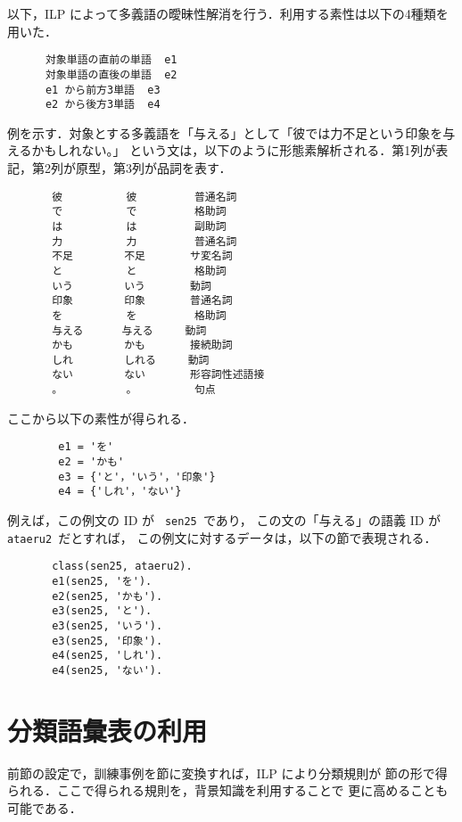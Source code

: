以下，ILP によって多義語の曖昧性解消を行う．利用する素性は以下の4種類を用いた．

\begin{verbatim}
      対象単語の直前の単語  e1 
      対象単語の直後の単語  e2 
      e1 から前方3単語  e3 
      e2 から後方3単語  e4
\end{verbatim}

例を示す．対象とする多義語を「与える」として「彼では力不足という印象を与えるかもしれない。」
という文は，以下のように形態素解析される．第1列が表記，第2列が原型，第3列が品詞を表す．

\begin{verbatim}
       彼          彼         普通名詞      
       で          で         格助詞        
       は          は         副助詞        
       力          力         普通名詞      
       不足        不足       サ変名詞      
       と          と         格助詞        
       いう        いう       動詞
       印象        印象       普通名詞      
       を          を         格助詞        
       与える      与える     動詞
       かも        かも       接続助詞      
       しれ        しれる     動詞
       ない        ない       形容詞性述語接
       。          。         句点          
\end{verbatim}

ここから以下の素性が得られる．

\begin{verbatim}
        e1 = 'を'
        e2 = 'かも'
        e3 = {'と'，'いう'，'印象'}
        e4 = {'しれ'，'ない'}
\end{verbatim}

例えば，この例文の ID が \verb| sen25 |であり，
この文の「与える」の語義 ID が\verb| ataeru2 |だとすれば，
この例文に対するデータは，以下の節で表現される．

\begin{verbatim}
       class(sen25, ataeru2).
       e1(sen25, 'を').
       e2(sen25, 'かも').
       e3(sen25, 'と'). 
       e3(sen25, 'いう').
       e3(sen25, '印象').
       e4(sen25, 'しれ').
       e4(sen25, 'ない').
\end{verbatim}


\section{分類語彙表の利用}


前節の設定で，訓練事例を節に変換すれば，ILP により分類規則が
節の形で得られる．ここで得られる規則を，背景知識を利用することで
更に高めることも可能である．

